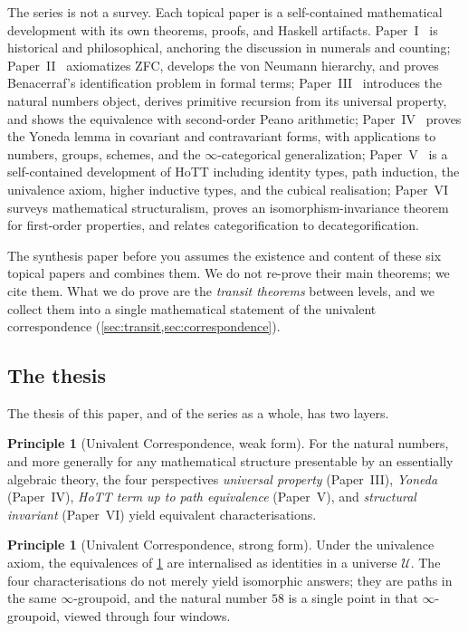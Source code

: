 \documentclass[12pt]{article}
\theoremstyle{definition}
\newtheorem{principle}[theorem]{Principle}
\theoremstyle{remark}
\newcommand{\U}{\mathcal{U}}
\begin{document}
The series is not a survey. Each topical paper is a self-contained
mathematical development with its own theorems, proofs, and Haskell
artifacts. Paper~I~\cite{paper-i} is historical and philosophical, anchoring
the discussion in numerals and counting; Paper~II~\cite{paper-ii}
axiomatizes ZFC, develops the von Neumann hierarchy, and proves Benacerraf's
identification problem in formal terms; Paper~III~\cite{paper-iii}
introduces the natural numbers object, derives primitive recursion from its
universal property, and shows the equivalence with second-order Peano
arithmetic; Paper~IV~\cite{paper-iv} proves the Yoneda lemma in covariant
and contravariant forms, with applications to numbers, groups, schemes, and
the $\infty$-categorical generalization; Paper~V~\cite{paper-v} is a
self-contained development of HoTT including identity types, path
induction, the univalence axiom, higher inductive types, and the cubical
realisation; Paper~VI~\cite{paper-vi} surveys mathematical structuralism,
proves an isomorphism-invariance theorem for first-order properties, and
relates categorification to decategorification.

The synthesis paper before you assumes the existence and content of these
six topical papers and combines them. We do not re-prove their main
theorems; we cite them. What we do prove are the \emph{transit theorems}
between levels, and we collect them into a single mathematical statement of
the univalent correspondence (\cref{sec:transit,sec:correspondence}).

\subsection{The thesis}

The thesis of this paper, and of the series as a whole, has two layers.

\begin{principle}[Univalent Correspondence, weak form]
\label{prin:weak}
For the natural numbers, and more generally for any mathematical
structure presentable by an essentially algebraic theory, the four
perspectives \emph{universal property} (Paper~III), \emph{Yoneda}
(Paper~IV), \emph{HoTT term up to path equivalence} (Paper~V), and
\emph{structural invariant} (Paper~VI) yield equivalent characterisations.
\end{principle}

\begin{principle}[Univalent Correspondence, strong form]
\label{prin:strong}
Under the univalence axiom, the equivalences of \cref{prin:weak} are
internalised as identities in a universe $\U$. The four characterisations
do not merely yield isomorphic answers; they are paths in the same
$\infty$-groupoid, and the natural number $58$ is a single point in that
$\infty$-groupoid, viewed through four windows.
\end{principle}
\end{document}
